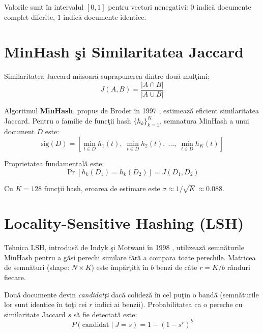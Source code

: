 \documentclass[a4paper,12pt]{report}
\begin{document}
Valorile sunt \^{i}n intervalul $[0, 1]$ pentru vectori nenegativi: $0$ indic\u{a} documente complet diferite, $1$ indic\u{a} documente identice.

\section{MinHash \c{s}i Similaritatea Jaccard}

Similaritatea Jaccard m\u{a}soar\u{a} suprapunerea dintre dou\u{a} mul\c{t}imi:
\begin{equation}
  J(A,B) = \frac{|A \cap B|}{|A \cup B|}
\label{eq:jaccard}
\end{equation}

Algoritmul \textbf{MinHash}, propus de Broder \^{i}n 1997 \cite{broder1997}, estimeaz\u{a} eficient similaritatea Jaccard. Pentru o familie de func\c{t}ii hash $\{h_k\}_{k=1}^{K}$, semnatura MinHash a unui document $D$ este:
\begin{equation}
  \text{sig}(D) = \left[\min_{t \in D} h_1(t),\; \min_{t \in D} h_2(t),\; \ldots,\; \min_{t \in D} h_K(t)\right]
\label{eq:minhash}
\end{equation}

Proprietatea fundamental\u{a} este:
\begin{equation}
  \Pr\!\left[h_k(D_1) = h_k(D_2)\right] = J(D_1, D_2)
\label{eq:minhash_prob}
\end{equation}

Cu $K = 128$ func\c{t}ii hash, eroarea de estimare este $\sigma \approx 1/\sqrt{K} \approx 0.088$.

\section{Locality-Sensitive Hashing (LSH)}

Tehnica \ac{LSH}, introdus\u{a} de Indyk \c{s}i Motwani \^{i}n 1998 \cite{indyk1998}, utilizeaz\u{a} semn\u{a}turile MinHash pentru a g\u{a}si perechi similare f\u{a}r\u{a} a compara toate perechile. Matricea de semn\u{a}turi (shape: $N \times K$) este \^{i}mp\u{a}r\c{t}it\u{a} \^{i}n $b$ benzi de c\^{a}te $r = K/b$ r\^{a}nduri fiecare.

Dou\u{a} documente devin \textit{candidat\c{t}i} dac\u{a} colidez\u{a} \^{i}n cel pu\c{t}in o band\u{a} (semn\u{a}turile lor sunt identice \^{i}n to\c{t}i cei $r$ indici ai benzii). Probabilitatea ca o pereche cu similaritate Jaccard $s$ s\u{a} fie detectat\u{a} este:
\begin{equation}
  P(\text{candidat} \mid J = s) = 1 - (1 - s^r)^b
\label{eq:lsh_prob}
\end{equation}
\end{document}
